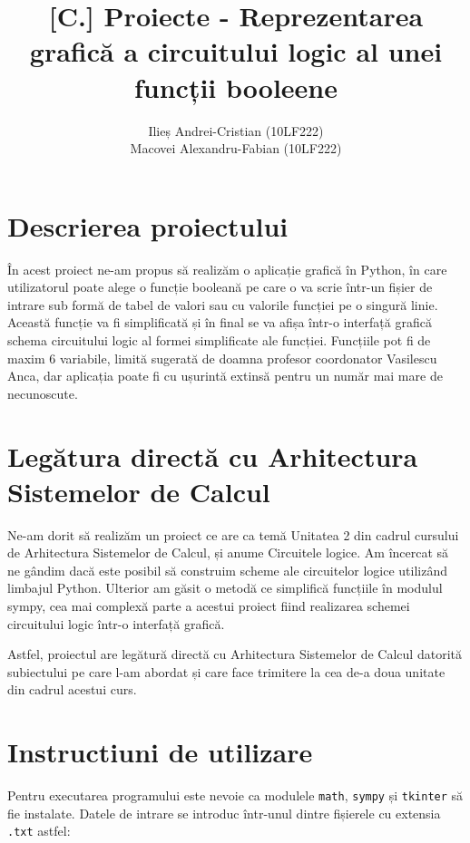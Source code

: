 \documentclass{article}
\title{[C.] Proiecte - Reprezentarea grafică a circuitului logic al unei funcții booleene}
\author{Ilieș Andrei-Cristian (10LF222)\\ Macovei Alexandru-Fabian (10LF222)}
\date{}
\begin{document}
\maketitle

\section*{Descrierea proiectului}
\hspace{0.5cm}În acest proiect ne-am propus să realizăm o aplicație grafică în Python, în care utilizatorul poate alege o funcție booleană pe care o va scrie într-un fișier de intrare sub formă de tabel de valori sau cu valorile funcției pe o singură linie. Această funcție va fi simplificată și în final se va afișa într-o interfață grafică schema circuitului logic al formei simplificate ale funcției. Funcțiile pot fi de maxim 6 variabile, limită sugerată de doamna profesor coordonator Vasilescu Anca, dar aplicația poate fi cu ușurintă extinsă pentru un număr mai mare de necunoscute.

\section*{Legătura directă cu Arhitectura Sistemelor de Calcul}
\hspace{0.5cm}Ne-am dorit să realizăm un proiect ce are ca temă Unitatea 2 din cadrul cursului de Arhitectura Sistemelor de Calcul, și anume Circuitele logice. Am încercat să ne gândim dacă este posibil să construim scheme ale circuitelor logice utilizând limbajul Python. Ulterior am găsit o metodă ce simplifică funcțiile în modulul sympy, cea mai complexă parte a acestui proiect fiind realizarea schemei circuitului logic într-o interfață grafică.

Astfel, proiectul are legătură directă cu Arhitectura Sistemelor de Calcul datorită subiectului pe care l-am abordat și care face trimitere la cea de-a doua unitate din cadrul acestui curs.

\section*{Instructiuni de utilizare}
\hspace{0.5cm}Pentru executarea programului este nevoie ca modulele \verb|math|, \verb|sympy| și \verb|tkinter| să fie instalate. Datele de intrare se introduc într-unul dintre fișierele cu extensia \verb|.txt| astfel:
\end{document}
